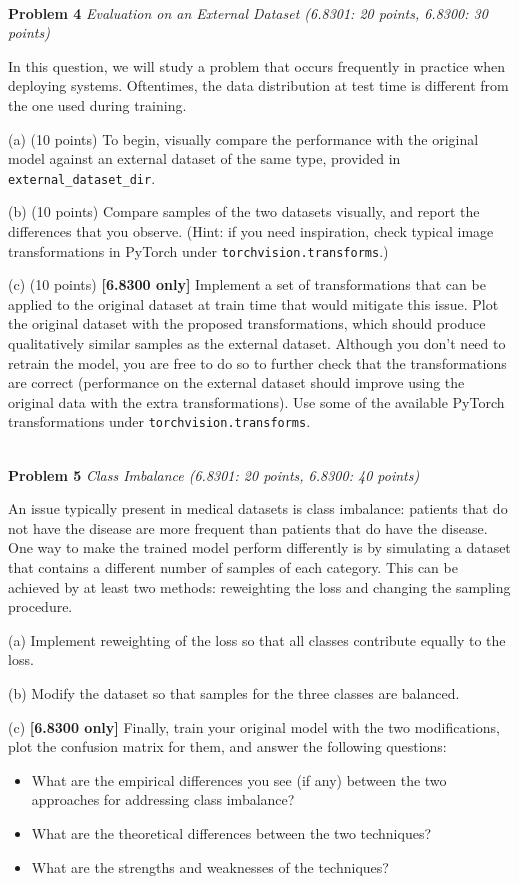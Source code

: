\documentclass[11pt]{article}
\newcommand{\hwproblem}[2] {\noindent \\ {\bf #1} {\it #2}}
\begin{document}
\hwproblem{Problem 4}{Evaluation on an External Dataset (6.8301: 20 points, 6.8300: 30 points)}

In this question, we will study a problem that occurs frequently in practice when deploying systems. Oftentimes, the data distribution at test time is different from the one used during training.

(a) (10 points) To begin, visually compare the performance with the original model against an external dataset of the same type, provided in \texttt{external\_dataset\_dir}.

(b) (10 points) Compare samples of the two datasets visually, and report the differences that you observe. (Hint: if you need inspiration, check typical image transformations in PyTorch under \texttt{torchvision.transforms}.)

(c) (10 points)  {\bf [6.8300 only]} Implement a set of transformations that can be applied to the original dataset at train time that would mitigate this issue. Plot the original dataset with the proposed transformations, which should produce qualitatively similar samples as the external dataset. Although you don't need to retrain the model, you are free to do so to further check that the transformations are correct (performance on the external dataset should improve using the original data with the extra transformations). Use some of the available PyTorch transformations under \texttt{torchvision.transforms}.

\hwproblem{Problem 5}{Class Imbalance (6.8301: 20 points, 6.8300: 40 points)}

An issue typically present in medical datasets is class imbalance: patients that do not have the disease are more frequent than patients that do have the disease. One way to make the trained model perform differently is by simulating a dataset that contains a different number of samples of each category. This can be achieved by at least two methods: reweighting the loss and changing the sampling procedure.

(a) Implement reweighting of the loss so that all classes contribute equally to the loss. 

(b) Modify the dataset so that samples for the three classes are balanced. 

(c) {\bf [6.8300 only]} Finally, train your original model with the two modifications, plot the confusion matrix for them, and answer the following questions:

\begin{itemize}
 \item What are the empirical differences you see (if any) between the two approaches for addressing class imbalance?
\item What are the theoretical differences between the two techniques? 
\item What are the strengths and weaknesses of the techniques?
\end{itemize}
\end{document}

